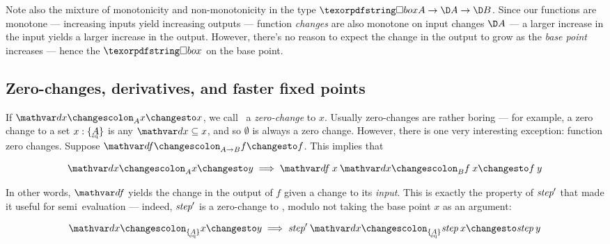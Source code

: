 

Note also the mixture of monotonicity and non-monotonicity in the type $\iso A
\to \D A \to \D B$. Since our functions are monotone --- increasing inputs yield
increasing outputs --- function \emph{changes} are also monotone on input
changes $\D A$ --- a larger increase in the input yields a larger increase in
the output. However, there's no reason to expect the change in the output to
grow as the \emph{base point} increases --- hence the $\iso$ on the base point.


\subsection{Zero-changes, derivatives, and faster fixed points}
\label{sec:derivatives}

If $\changesat A \dx x x$, we call \dx\ a \emph{zero-change} to $x$. Usually
zero-changes are rather boring --- for example, a zero change to a set $x :
\tseteq{A}$ is any $\dx \subseteq x$, and so $\emptyset$ is always a zero
change.
%
However, there is one very interesting exception: function zero changes. Suppose
$\changesat{A \to B}{\df}{f}{f}$. This implies that

\begin{equation}\label{eqn:derivative}
  \changesat A \dx x y \implies \changesat B{\df\<x\<\dx}{f\<x}{f\<y}
\end{equation}

\noindent
In other words, $\df$ yields the change in the output of $f$ given a change to
its \emph{input}.
%
This is exactly the property of $\text{\itshape step}'$ that made it useful for
semi\naive\ evaluation --- indeed, $\text{\itshape step}'$ is a zero-change to
, modulo not taking the base point $x$ as an argument:

\[ \changesat{\tseteq A} \dx x y \implies
\changesat{\tseteq A}{\name{step}'\<\dx}{\name{step}\<x}{\name{step}\<y}
\]

